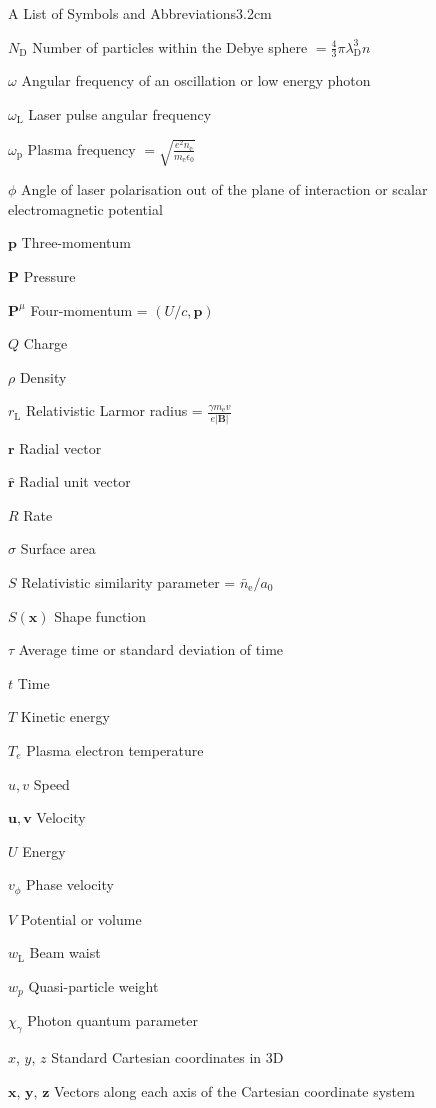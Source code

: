 \begin{mclistof}{A List of Symbols and Abbreviations}{3.2cm}
\item[$N_\mathrm{D}$] Number of particles within the Debye sphere $= \frac{4}{3}\pi \lambda^3_\mathrm{D}n$
\item[$\omega$] Angular frequency of an oscillation or low energy photon
\item[$\omega_\mathrm{L}$] Laser pulse angular frequency
\item[$\omega_\mathrm{p}$] Plasma frequency $= \sqrt{\frac{e^2n_\mathrm{e}}{m_\mathrm{e}\epsilon_0}}$
\item[$\phi$] Angle of laser polarisation out of the plane of interaction or scalar electromagnetic potential
\item[$\mathbf{p}$] Three-momentum
\item[$\mathbf{P}$] Pressure
\item[$\mathbf{P}^\mu$] Four-momentum = $(U/c, \mathbf{p})$
\item[$Q$] Charge
\item[$\rho$] Density
\item[$r_\mathrm{L}$] Relativistic Larmor radius  = $\frac{\gamma m_\mathrm{e} v}{e|\mathbf{B}|}$
\item[$\mathbf{r}$] Radial vector
\item[$\hat{\mathbf{r}}$] Radial unit vector
\item[$R$] Rate
\item[$\sigma$] Surface area
\item[$S$] Relativistic similarity parameter = $\bar{n}_\mathrm{e}/a_0$
\item[$S(\mathbf{x})$] Shape function
\item[$\tau$] Average time or standard deviation of time
\item[$t$] Time
\item[$T$] Kinetic energy
\item[$T_e$] Plasma electron temperature
\item[$u,v$] Speed
\item[$\mathbf{u},\mathbf{v}$] Velocity
\item[$U$] Energy
\item[$v_\phi$] Phase velocity
\item[$V$] Potential or volume
\item[$w_\mathrm{L}$] Beam waist
\item[$w_p$] Quasi-particle weight
\item[$\chi_\gamma$] Photon quantum parameter
\item[$x$, $y$, $z$] Standard Cartesian coordinates in 3D
\item[$\mathbf{x}$, $\mathbf{y}$, $\mathbf{z}$] Vectors along each axis of the Cartesian coordinate system

\end{mclistof}

